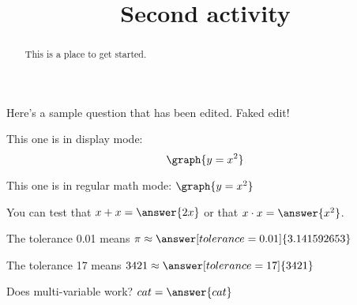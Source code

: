 \documentclass[handout]{ximera}
\title{Second activity}
\begin{document}
\begin{abstract}
  This is a place to get started.
\end{abstract}


\maketitle

Here's a sample question that has been edited. Faked edit!


This one is in display mode:
\[ \graph{y=x^2} \]

This one is in regular math mode:
\( \graph{y=x^2} \)


\begin{problem}
\begin{multipleChoice}
\end{multipleChoice}
\end{problem}

\begin{problem}
   You can test that $x + x = \answer{2x}$ or that $x \cdot x = \answer{x^2}$.
\end{problem}

\begin{problem}
   The tolerance 0.01 means $\pi \approx \answer[tolerance=0.01]{3.141592653}$
\end{problem}

\begin{problem}
   The tolerance 17 means $3421 \approx \answer[tolerance=17]{3421}$
\end{problem}

\begin{problem}
Does multi-variable work? $ cat = \answer{cat}$
\end{problem}
\end{document}

